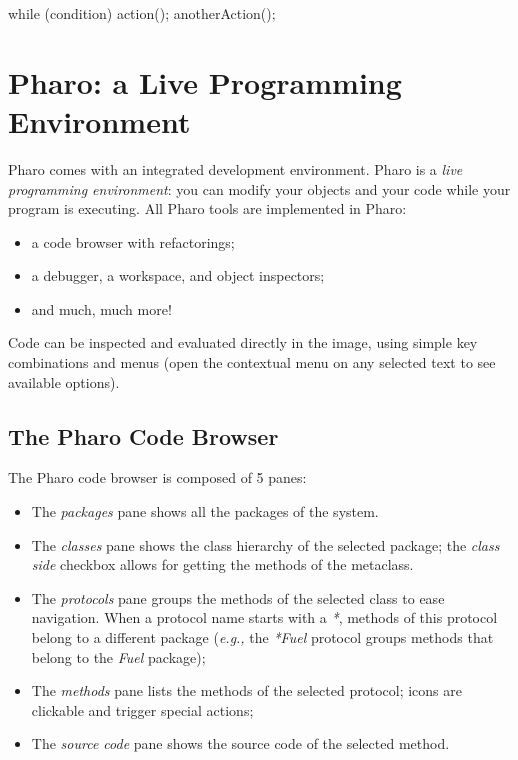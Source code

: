 \documentclass[notumble]{leaflet}
\newcommand{\eg}{\emph{e.g.,}\xspace}
\begin{document}
while (condition) { action();
anotherAction(); }


\section{Pharo: a Live Programming Environment}

Pharo comes with an integrated development environment. Pharo
is a \emph{live programming environment}: you can modify your objects
and your code while your program is executing. All Pharo tools are
implemented in Pharo:
\begin{itemize}
\item a code browser with refactorings;
\item a debugger, a workspace, and object inspectors;
\item and much, much more!
\end{itemize}

Code can be inspected and evaluated directly in the image, using
simple key combinations and menus (open the contextual menu on any
selected text to see available options).


\subsection{The Pharo Code Browser}

The Pharo code browser is composed of 5 panes:

\begin{itemize}
\item The \emph{packages} pane shows all the packages of the system.
\item The \emph{classes} pane shows the class hierarchy of the
  selected package; the \emph{class side} checkbox allows for getting
  the methods of the metaclass.
\item The \emph{protocols} pane groups the methods of the selected
  class to ease navigation.  When a protocol name starts with a \emph{*}, methods of this
  protocol belong to a different package (\eg the \emph{*Fuel}
  protocol groups methods that belong to the \emph{Fuel} package);
\item The \emph{methods} pane lists the methods of the selected
  protocol; icons are clickable and trigger special actions;
\item The \emph{source code} pane shows the source code of the
  selected method. 
\end{itemize}
\end{document}
